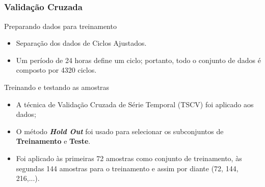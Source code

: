 \documentclass[aspectratio=169]{beamer}
\begin{document}
\subsection{}
\begin{frame}
\frametitle{Validação Cruzada}
\small
\begin{block}{Preparando dados para treinamento}
\begin{itemize} \small
    \item Separação dos dados de Ciclos Ajustados.
    \item Um período de 24 horas define um ciclo; portanto, todo o conjunto de dados é composto por 4320 ciclos.
\end{itemize}
\end{block}

\begin{block}{Treinando e testando as amostras}
\begin{itemize} \small
    \item A técnica de Validação Cruzada de Série Temporal (TSCV) foi aplicado aos dados;
    \item O método \textbf{\textit{Hold Out}} foi usado para selecionar os subconjuntos de \textbf{Treinamento} e \textbf{Teste}.
    \item Foi aplicado às primeiras 72 amostras como conjunto de treinamento, às segundas 144 amostras para o treinamento e assim por diante (72, 144, 216,...).
\end{itemize}
\end{block}
\end{frame}
\end{document}
